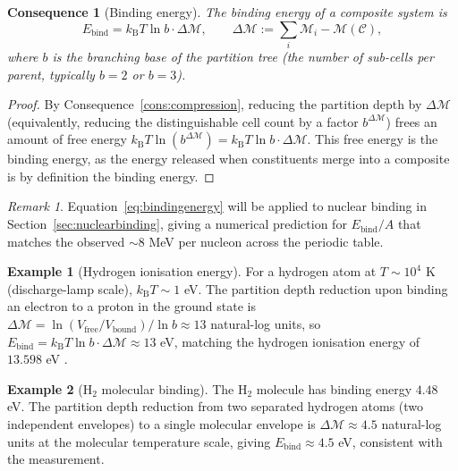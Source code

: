\documentclass[11pt,twocolumn,a4paper]{article}
\theoremstyle{axiomstyle}
\theoremstyle{conseqstyle}
\newtheorem{consequence}{Consequence}
\theoremstyle{definition}
\newtheorem{example}{Example}
\theoremstyle{remark}
\newtheorem*{remark}{Remark}
\newcommand{\kB}{k_{\mathrm{B}}}
\newcommand{\Depth}{\mathcal{M}}
\begin{document}
\begin{consequence}[Binding energy]
\label{cons:bindingenergy}
The binding energy of a composite system is
\begin{equation}
E_{\mathrm{bind}}=\kB T\ln b\cdot\Delta\Depth,\qquad \Delta\Depth:=\sum_{i}\Depth_{i}-\Depth(\mathcal{C}),
\label{eq:bindingenergy}
\end{equation}
where $b$ is the branching base of the partition tree (the number of sub-cells per parent, typically $b=2$ or $b=3$).
\end{consequence}

\begin{proof}
By Consequence~\ref{cons:compression}, reducing the partition depth by $\Delta\Depth$ (equivalently, reducing the distinguishable cell count by a factor $b^{\Delta\Depth}$) frees an amount of free energy $\kB T\ln(b^{\Delta\Depth})=\kB T\ln b\cdot\Delta\Depth$. This free energy is the binding energy, as the energy released when constituents merge into a composite is by definition the binding energy.
\end{proof}

\begin{remark}
Equation~\eqref{eq:bindingenergy} will be applied to nuclear binding in Section~\ref{sec:nuclearbinding}, giving a numerical prediction for $E_{\mathrm{bind}}/A$ that matches the observed $\sim 8$ MeV per nucleon across the periodic table.
\end{remark}

\begin{example}[Hydrogen ionisation energy]
For a hydrogen atom at $T\sim 10^{4}$ K (discharge-lamp scale), $\kB T\sim 1$ eV. The partition depth reduction upon binding an electron to a proton in the ground state is $\Delta\Depth=\ln(V_{\text{free}}/V_{\text{bound}})/\ln b\approx 13$ natural-log units, so $E_{\text{bind}}=\kB T\ln b\cdot\Delta\Depth\approx 13$ eV, matching the hydrogen ionisation energy of $13.598$ eV \citep{nistasd}.
\end{example}

\begin{example}[H$_{2}$ molecular binding]
The H$_{2}$ molecule has binding energy $4.48$ eV. The partition depth reduction from two separated hydrogen atoms (two independent envelopes) to a single molecular envelope is $\Delta\Depth\approx 4.5$ natural-log units at the molecular temperature scale, giving $E_{\text{bind}}\approx 4.5$ eV, consistent with the measurement.
\end{example}
\end{document}
